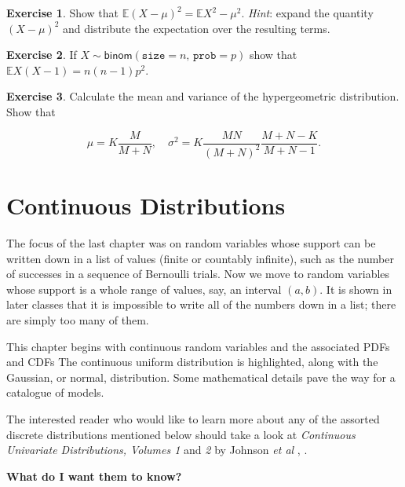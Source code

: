 \documentclass[]{book}
\numberwithin{equation}{chapter}
\numberwithin{figure}{chapter}
\theoremstyle{plain}
\theoremstyle{definition}
\newtheorem{xca}{Exercise}[chapter]
\theoremstyle{remark}
\theoremstyle{definition}
\theoremstyle{definition}
\theoremstyle{remark}
\begin{document}
\bigskip

\begin{xca}
Show that \(\mathbb{E}(X - \mu)^{2} = \mathbb{E} X^{2} - \mu^{2}\).
\emph{Hint}: expand the quantity \((X - \mu)^{2}\) and distribute the
expectation over the resulting terms.
\end{xca}

\bigskip

\begin{xca}
If \(X\sim\mathsf{binom}(\mathtt{size}=n,\,\mathtt{prob}=p)\) show that
\(\mathbb{E} X(X - 1) = n(n - 1)p^{2}\).
\end{xca}

\bigskip

\begin{xca}
Calculate the mean and variance of the hypergeometric distribution. Show
that

\begin{equation}
\mu=K\frac{M}{M + N},\quad \sigma^{2} = K\frac{MN}{(M + N)^{2}}\frac{M + N - K}{M + N - 1}.
\end{equation}
\end{xca}

\chapter{Continuous Distributions}\label{cha-continuous-distributions}

The focus of the last chapter was on random variables whose support can
be written down in a list of values (finite or countably infinite), such
as the number of successes in a sequence of Bernoulli trials. Now we
move to random variables whose support is a whole range of values, say,
an interval \((a,b)\). It is shown in later classes that it is
impossible to write all of the numbers down in a list; there are simply
too many of them.

This chapter begins with continuous random variables and the associated
PDFs and CDFs The continuous uniform distribution is highlighted, along
with the Gaussian, or normal, distribution. Some mathematical details
pave the way for a catalogue of models.

The interested reader who would like to learn more about any of the
assorted discrete distributions mentioned below should take a look at
\emph{Continuous Univariate Distributions, Volumes 1} and \emph{2} by
Johnson \emph{et al} \autocite{Johnson1994}, \autocite{Johnson1995}.

\textbf{What do I want them to know?}
\end{document}
